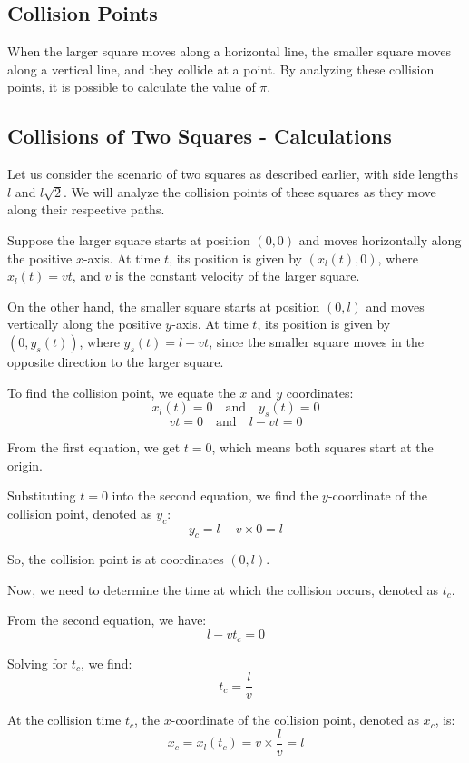 \documentclass{article}
\begin{document}
\subsection{Collision Points}
When the larger square moves along a horizontal line, the smaller square moves along a vertical line, and they collide at a point. By analyzing these collision points, it is possible to calculate the value of $\pi$.

\subsection{Collisions of Two Squares - Calculations}

Let us consider the scenario of two squares as described earlier, with side lengths $l$ and $l\sqrt{2}$. We will analyze the collision points of these squares as they move along their respective paths.

Suppose the larger square starts at position $(0, 0)$ and moves horizontally along the positive $x$-axis. At time $t$, its position is given by $(x_l(t), 0)$, where $x_l(t) = vt$, and $v$ is the constant velocity of the larger square.

On the other hand, the smaller square starts at position $(0, l)$ and moves vertically along the positive $y$-axis. At time $t$, its position is given by $(0, y_s(t))$, where $y_s(t) = l - vt$, since the smaller square moves in the opposite direction to the larger square.

To find the collision point, we equate the $x$ and $y$ coordinates:
\[
x_l(t) = 0 \quad \text{and} \quad y_s(t) = 0
\]
\[
vt = 0 \quad \text{and} \quad l - vt = 0
\]

From the first equation, we get $t = 0$, which means both squares start at the origin.

Substituting $t = 0$ into the second equation, we find the $y$-coordinate of the collision point, denoted as $y_c$:
\[
y_c = l - v \times 0 = l
\]

So, the collision point is at coordinates $(0, l)$.

Now, we need to determine the time at which the collision occurs, denoted as $t_c$.

From the second equation, we have:
\[
l - vt_c = 0
\]

Solving for $t_c$, we find:
\[
t_c = \frac{l}{v}
\]

At the collision time $t_c$, the $x$-coordinate of the collision point, denoted as $x_c$, is:
\[
x_c = x_l(t_c) = v \times \frac{l}{v} = l
\]
\end{document}
